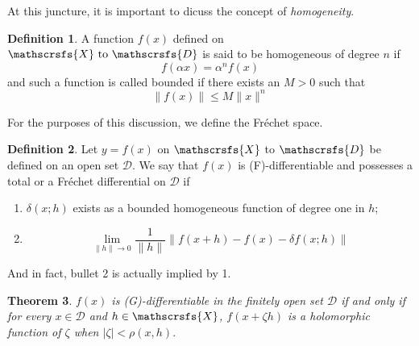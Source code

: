 \documentclass[a4paper]{article}
\newtheorem{theorem}{Theorem}[section]
\theoremstyle{definition}
\newtheorem{definition}[theorem]{Definition}
\begin{document}
At this juncture, it is important to dicuss the concept of \textit{homogeneity}.
\begin{definition}
	A function $f(x)$ defined on $\mathscrsfs{X}\text{ to }\mathscrsfs{D}$ is said to be homogeneous of degree $n$ if 
	\begin{equation}
		f(\alpha x)=\alpha^nf(x)
	\end{equation}
	and such a function is called bounded if there exists an $M>0$ such that
	\begin{equation}
		\|f(x)\|\leq M\|x\|^n
	\end{equation} 
\end{definition}
For the purposes of this discussion, we define the Fréchet space.
\begin{definition}
	Let $y=f(x)$ on $\mathscrsfs{X}$ to $\mathscrsfs{D}$ be defined on an open set $\mathcal{D}$. We say that $f(x)$ is (F)-differentiable and possesses a total or a Fréchet differential on $\mathcal{D}$ if
	\begin{enumerate}
		\item $\delta(x;h)$ exists as a bounded homogeneous function of degree one in $h$;
		\item \begin{equation}
			\lim_{\|h\|\to0}\frac{1}{\|h\|}\|f(x+h)-f(x)-\delta f(x;h)\|
		\end{equation}
	\end{enumerate}
\end{definition}
And in fact, bullet 2 is actually implied by 1.
\begin{theorem}
	$f(x)$ is (G)-differentiable in the finitely open set $\mathcal{D}$ if and only if for every $x\in\mathcal{D}$ and $h\in\mathscrsfs{X}$, $f(x+\zeta h)$ is a holomorphic function of $\zeta$ when $|\zeta|<\rho(x,h).$
\end{theorem}
\end{document}
